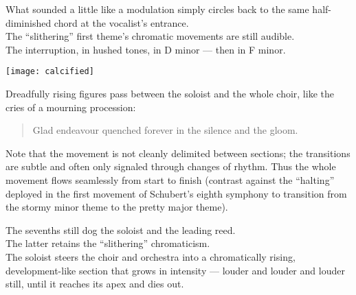\documentclass{beamer}
\begin{document}
\begin{frame}
  What sounded a little like a modulation simply circles back to the same half-diminished chord at the vocalist's entrance. 
  \pause \\ 
  The ``slithering'' first theme's chromatic movements are still audible. 
  \pause \\ 
  The interruption, in hushed tones, in D minor --- \pause then in F minor. 
\end{frame} 

\begin{frame} 
  \begin{center} 
    \texttt{[image: calcified]} 
  \end{center} 
  Dreadfully rising figures pass between the soloist and the whole choir, like the cries of a mourning procession: 
  \pause 
  \begin{quote} %
    Glad{\pause} en{\pause}dea{\pause}vour{\pause} quenched{\pause} for{\pause}e{\pause}ver{\pause} in{\pause} the{\pause} si{\pause}lence{\pause} and{\pause} the{\pause} gloom. 
  \end{quote} 
\end{frame} 

\begin{frame}
  Note that the movement is not cleanly delimited between sections; the transitions are subtle and often only signaled through changes of rhythm. Thus the whole movement flows seamlessly from start to finish (contrast against the ``halting'' deployed in the first movement of Schubert's eighth symphony to transition from the stormy minor theme to the pretty major theme). 
\end{frame} 

\begin{frame}
  The sevenths still dog the soloist and the leading reed. 
  \pause \\ 
  The latter retains the ``slithering'' chromaticism. 
  \pause \\ 
  The soloist steers the choir and orchestra into a chromatically rising, development-like section that grows in intensity --- louder and louder and louder still, until it reaches its apex and dies out. 
\end{frame} 
\end{document}
